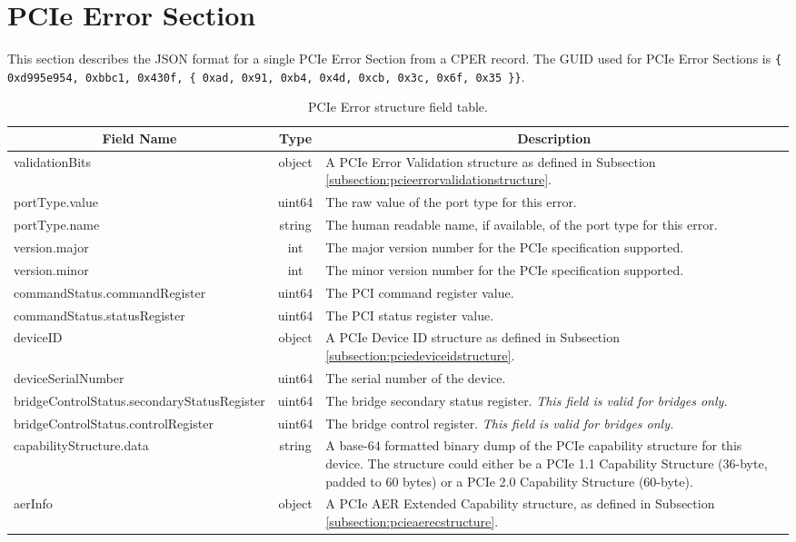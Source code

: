 \documentclass{report}
\newcommand*{\thead}[1]{\multicolumn{1}{|c|}{\bfseries #1}}
\newcommand*{\jsontable}[1]{
    \begin{table}[!ht]
    \label{#1}
    \centering
    \begin{adjustbox}{center}
    \begin{tabular}{|l|c|p{8cm}|}
    \hline
    \thead{Field Name} & \thead{Type} & \thead{Description} \\
    \hline
}
\newcommand*{\jsontableend}[1]{
    \hline
    \end{tabular}
    \end{adjustbox}
    \caption{#1}
    \label{table:#1}
    \end{table}
    \FloatBarrier
}
\begin{document}
\section{PCIe Error Section}
\label{section:pcieerrorsection}
This section describes the JSON format for a single PCIe Error Section from a CPER record. The GUID used for PCIe Error Sections is \texttt{\{ 0xd995e954, 0xbbc1, 0x430f, \{ 0xad, 0x91, 0xb4, 0x4d, 0xcb, 0x3c, 0x6f, 0x35 \}\}}.
\jsontable{table:pcieerrorsection}
validationBits & object & A PCIe Error Validation structure as defined in Subsection \ref{subsection:pcieerrorvalidationstructure}.\\
\hline
portType.value & uint64 & The raw value of the port type for this error.\\
portType.name & string & The human readable name, if available, of the port type for this error.\\
\hline
version.major & int & The major version number for the PCIe specification supported.\\
version.minor & int & The minor version number for the PCIe specification supported.\\
\hline
commandStatus.commandRegister & uint64 & The PCI command register value.\\
commandStatus.statusRegister & uint64 & The PCI status register value.\\
\hline
deviceID & object & A PCIe Device ID structure as defined in Subsection \ref{subsection:pciedeviceidstructure}.\\
\hline
deviceSerialNumber & uint64 & The serial number of the device.\\
\hline
bridgeControlStatus.secondaryStatusRegister & uint64 & The bridge secondary status register. \emph{This field is valid for bridges only.}\\
\hline
bridgeControlStatus.controlRegister & uint64 & The bridge control register. \emph{This field is valid for bridges only.}\\
\hline
capabilityStructure.data & string & A base-64 formatted binary dump of the PCIe capability structure for this device. The structure could either be a PCIe 1.1 Capability Structure (36-byte, padded to 60 bytes) or a PCIe 2.0 Capability Structure (60-byte).\\
\hline
aerInfo & object & A PCIe AER Extended Capability structure, as defined in Subsection \ref{subsection:pcieaerecstructure}.\\
\jsontableend{PCIe Error structure field table.}
\end{document}
